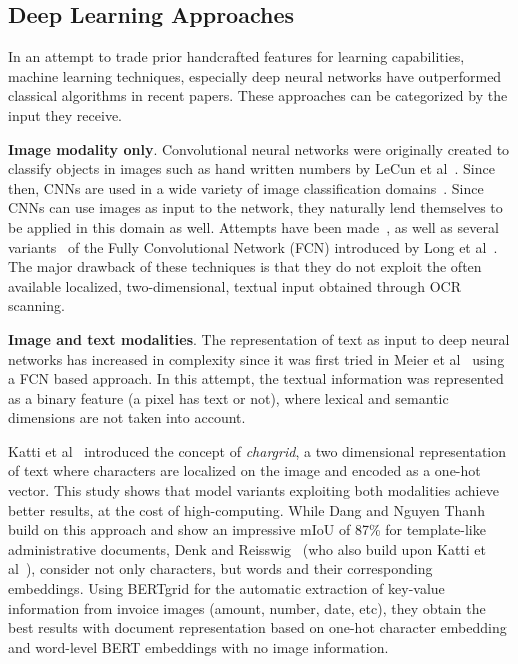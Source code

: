 \documentclass[oneside, english, bibtex]{kththesis}
\begin{document}
\subsection{Deep Learning Approaches}
\label{subs:dlapproaches}

In an attempt to trade prior handcrafted features for learning capabilities, machine learning techniques, especially deep neural networks have outperformed classical algorithms in recent papers. These approaches can be categorized by the input they receive.

\textbf{Image modality only}. Convolutional neural networks were originally created to classify objects in images such as hand written numbers by LeCun et al~\cite{lecun1989}. Since then, CNNs are used in a wide variety of image classification domains~\cite{deng2009}. Since CNNs can use images as input to the network, they naturally lend themselves to be applied in this domain as well. Attempts have been made~\cite{DBLP:journals/corr/0011S17}, as well as several variants~\cite{he2017, xu2017, wickpuppe2018, oliveira2018} of the Fully Convolutional Network (FCN) introduced by Long et al~\cite{DBLP:journals/corr/LongSD14}. The major drawback of these techniques is that they do not exploit the often available localized, two-dimensional, textual input obtained through OCR scanning.

\textbf{Image and text modalities}. The representation of text as input to deep neural networks has increased in complexity since it was first tried in Meier et al~\cite{8270006} using a FCN based approach. In this attempt, the textual information was represented as a binary feature (a pixel has text or not), where lexical and semantic dimensions are not taken into account.

Katti et al~\cite{katti2018} introduced the concept of \textit{chargrid}, a two dimensional representation of text where characters are localized on the image and encoded as a one-hot vector. This study shows that model variants exploiting both modalities achieve better results, at the cost of high-computing. While Dang and Nguyen Thanh~\cite{DBLP:journals/corr/abs-2106-00952} build on this approach and show an impressive mIoU of 87\% for template-like administrative documents, Denk and Reisswig~\cite{DBLP:journals/corr/abs-1909-04948} (who also build upon Katti et al~\cite{katti2018}), consider not only characters, but words and their corresponding embeddings. Using BERTgrid for the automatic extraction of key-value information from invoice images (amount, number, date, etc), they obtain the best results with document representation based on one-hot character embedding and word-level BERT embeddings with no image information.
\end{document}
